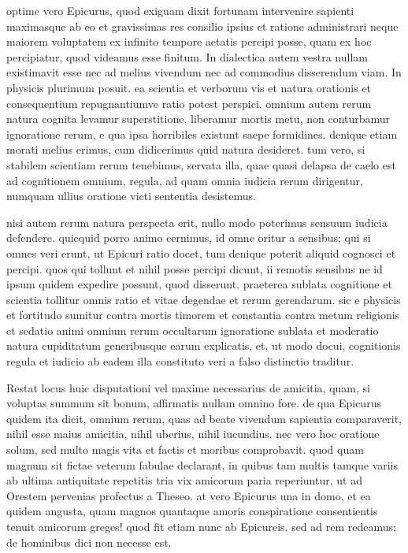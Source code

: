  optime vero Epicurus, quod exiguam dixit fortunam intervenire sapienti maximasque ab eo et gravissimas res consilio ipsius et ratione administrari neque maiorem voluptatem ex infinito tempore aetatis percipi posse, quam ex hoc percipiatur, quod videamus esse finitum. In dialectica autem vestra nullam existimavit esse nec ad melius vivendum nec ad commodius disserendum viam. In physicis plurimum posuit. ea scientia et verborum vis et natura orationis et consequentium repugnantiumve ratio potest perspici. omnium autem rerum natura cognita levamur superstitione, liberamur mortis metu, non conturbamur ignoratione rerum, e qua ipsa horribiles existunt saepe formidines. denique etiam morati melius erimus, cum didicerimus quid natura desideret. tum vero, si stabilem scientiam rerum tenebimus, servata illa, quae quasi delapsa de caelo est ad cognitionem omnium, regula, ad quam omnia iudicia rerum dirigentur, numquam ullius oratione victi sententia desistemus.

 nisi autem rerum natura perspecta erit, nullo modo poterimus sensuum iudicia defendere. quicquid porro animo cernimus, id omne oritur a sensibus; qui si omnes veri erunt, ut Epicuri ratio docet, tum denique poterit aliquid cognosci et percipi. quos qui tollunt et nihil posse percipi dicunt, ii remotis sensibus ne id ipsum quidem expedire possunt, quod disserunt. praeterea sublata cognitione et scientia tollitur omnis ratio et vitae degendae et rerum gerendarum. sic e physicis et fortitudo sumitur contra mortis timorem et constantia contra metum religionis et sedatio animi omnium rerum occultarum ignoratione sublata et moderatio natura cupiditatum generibusque earum explicatis, et, ut modo docui, cognitionis regula et iudicio ab eadem illa constituto veri a falso distinctio traditur.

 Restat locus huic disputationi vel maxime necessarius de amicitia, quam, si voluptas summum sit bonum, affirmatis nullam omnino fore. de qua Epicurus quidem ita dicit, omnium rerum, quas ad beate vivendum sapientia comparaverit, nihil esse maius amicitia, nihil uberius, nihil iucundius. nec vero hoc oratione solum, sed multo magis vita et factis et moribus comprobavit. quod quam magnum sit fictae veterum fabulae declarant, in quibus tam multis tamque variis ab ultima antiquitate repetitis tria vix amicorum paria reperiuntur, ut ad Orestem pervenias profectus a Theseo. at vero Epicurus una in domo, et ea quidem angusta, quam magnos quantaque amoris conspiratione consentientis tenuit amicorum greges! quod fit etiam nunc ab Epicureis. sed ad rem redeamus; de hominibus dici non necesse est.

